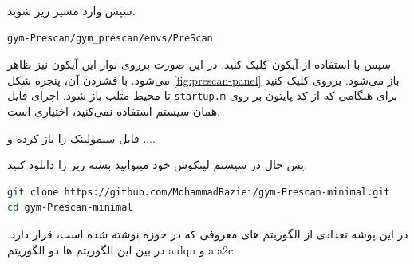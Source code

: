 سپس وارد مسیر زیر شوید.
\begin{center}
\begin{latin}
\begin{verbatim}
gym-Prescan/gym_prescan/envs/PreScan
\end{verbatim}
\end{latin}
\end{center}

سپس با استفاده از آیکون 
کلیک کنید. در این صورت برروی نوار  این آیکون نیز ظاهر می‌شود. با فشردن آن،
 پنجره شکل 
\ref{fig:prescan-panel}
باز می‌شود. برروی  کلیک کنید تا محیط متلب باز شود. اچرای فایل \texttt{startup.m} برای هنگامی که از کد پایتون بر روی همان سیستم استفاده نمی‌کنید، اختیاری است. 

فایل سیمولینک را باز کرده و ....



پس حال در سیستم لینکوس خود میتوانید بسته زیر را دانلود کنید.

\begin{latin}
\begin{lstlisting}[language=bash]
git clone https://github.com/MohammadRaziei/gym-Prescan-minimal.git
cd gym-Prescan-minimal
\end{lstlisting}
\end{latin}

در این پوشه تعدادی از الگوریتم های معروفی که در حوزه  نوشته شده است، قرار دارد.
در بین این الگوریتم ها دو الگوریتم \gls{a:dqn} و \gls{a:a2c}


























